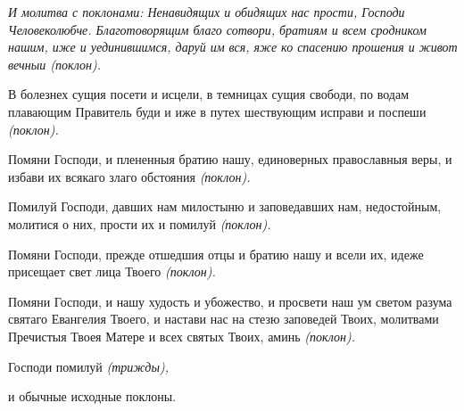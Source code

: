 \itshape И молитва с поклонами:\normalfont{} Ненавидящих и обидящих нас прости, Господи Человеколюбче. Благотоворящим благо сотвори, братиям и всем сродником нашим, иже и уединившимся, даруй им вся, яже ко спасению прошения и живот вечныи \itshape (поклон)\normalfont{}.


В болезнех сущия посети и исцели, в темницах сущия свободи, по водам плавающим Правитель буди и иже в путех шествующим исправи и поспеши \itshape (поклон)\normalfont{}.


Помяни Господи, и плененныя братию нашу, единоверных православныя веры, и избави их всякаго злаго обстояния \itshape (поклон)\normalfont{}.


Помилуй Господи, давших нам милостыню и заповедавших нам, недостойным, молитися о них, прости их и помилуй \itshape (поклон)\normalfont{}.


Помяни Господи, прежде отшедшия отцы и братию нашу и всели их, идеже присещает свет лица Твоего \itshape (поклон)\normalfont{}.


Помяни Господи, и нашу худость и убожество, и просвети наш ум светом разума святаго Евангелия Твоего, и настави нас на стезю заповедей Твоих, молитвами Пречистыя Твоея Матере и всех святых Твоих, аминь \itshape (поклон)\normalfont{}.


Господи помилуй \itshape (трижды)\normalfont{},


и обычные исходные поклоны.




\mychapterending